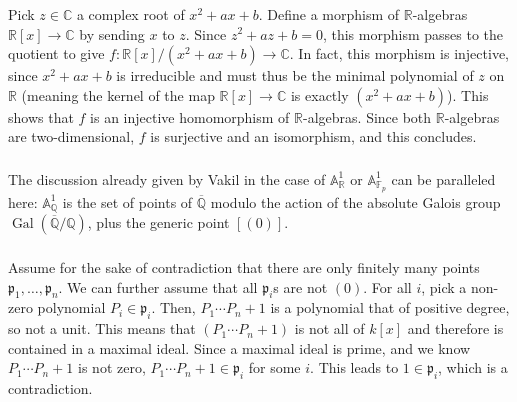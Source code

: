 \documentclass{article}
\newcommand{\Q}{\mathbb{Q}}
\newcommand{\R}{\mathbb{R}}
\newcommand{\C}{\mathbb{C}}
\newcommand{\F}{\mathbb{F}}
\DeclareMathOperator{\Gal}{Gal}
\newcommand{\p}{\mathfrak{p}}
\newcommand{\exercise}{\subsubsection} %
\begin{document}
\exercise{} Pick $z \in \C$ a complex root of $x^2 + ax + b$. Define a morphism of $\R$-algebras $\R[x] \to \C$ by sending $x$ to $z$. Since $z^2 + az + b = 0$, this morphism passes to the quotient to give $f : \R[x]/(x^2 + ax + b) \to \C$. In fact, this morphism is injective, since $x^2 + ax + b$ is irreducible and must thus be the minimal polynomial of $z$ on $\R$ (meaning the kernel of the map $\R[x] \to \C$ is exactly $(x^2 + ax +b)$). This shows that $f$ is an injective homomorphism of $\R$-algebras. Since both $\R$-algebras are two-dimensional, $f$ is surjective and an isomorphism, and this concludes.

\exercise{} The discussion already given by Vakil in the case of $\mathbb{A}^1_\R$ or $\mathbb{A}_{\F_p}^1$ can be paralleled here: $\mathbb{A}^1_\Q$ is the set of points of $\overline{\Q}$ modulo the action of the absolute Galois group $\Gal(\overline{\Q}/\Q)$, plus the generic point $[(0)]$.

\exercise{} Assume for the sake of contradiction that there are only finitely many points $\p_1, \dots, \p_n$. We can further assume that all $\p_i$s are not $(0)$. For all $i$, pick a non-zero polynomial $P_i \in \p_i$. Then, $P_1 \cdots P_n + 1$ is a polynomial that of positive degree, so not a unit. This means that $(P_1 \cdots P_n + 1)$ is not all of $k[x]$ and therefore is contained in a maximal ideal. Since a maximal ideal is prime, and we know $P_1 \cdots P_n + 1$ is not zero, $P_1 \cdots P_n + 1 \in \p_i$ for some $i$. This leads to $1 \in \p_i$, which is a contradiction.
\end{document}
